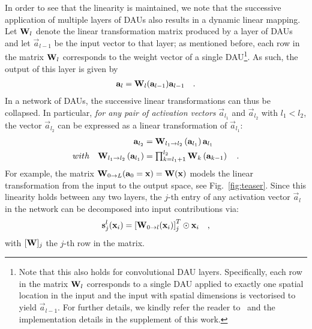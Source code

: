  In order to see that the linearity is maintained, we note that the successive application of multiple layers of DAUs also results in a dynamic linear mapping. Let $\mat W_l$ denote the linear transformation matrix produced by a layer of DAUs and let $\vec a_{l-1}$ be the input vector to that layer; as mentioned before, each row in the matrix $\mat w_l$ corresponds to the weight vector of a single DAU\footnote{
Note that this also holds for convolutional DAU layers. Specifically, each row in the matrix $\mat w_l$ corresponds to a single DAU applied to exactly one spatial location in the input and the input with spatial dimensions is vectorised to yield $\vec a_{l-1}$. For further details, we kindly refer the reader to~\cite{convlin} and the implementation details in the supplement of this work.}. As such, the output of this layer is given by 
\begin{align}
    \vec a_l = \mat W_l (\vec a_{l-1}) \vec a_{l-1}\quad .
\end{align}
In a network of DAUs, the successive linear transformations can thus be collapsed. In particular, \emph{for any pair of activation vectors} $\vec{a}_{l_1}$ and $\vec{a}_{l_2}$ with ${l_1}<{l_2}$, the vector $\vec{a}_{l_2}$ can 
    be expressed as a linear transformation of $\vec{a}_{l_1}$:
\begin{align}
\label{eq:collapse}
    \vec{a}_{l_2} &= \mat{W}_{{l_1}\rightarrow {l_2}} \left(\vec{a}_{l_1}\right)\vec{a}_{l_1} \quad 
        \\{with} \quad \mat{W}_{{l_1}\rightarrow {l_2}}\left(\vec{a}_{l_1}\right) &= \textstyle\prod_{k={l_1}+1}^{l_2} \mat{W}_k \left(\vec{a}_{k-1}\right)\quad \text{.}
\end{align}
For example, the matrix $\mat W_{0\rightarrow L}(\vec{a}_0 = \vec{x}) = \mat W(\vec{x})$ models the linear transformation from the input to the output space, see Fig.~\ref{fig:teaser}.
Since this linearity holds between any two layers, the $j$-th entry of any activation vector $\vec a_l$ in the network can be decomposed into input contributions via:
    \begin{align}
    \label{eq:contrib}
        \vec{s}_{j}^l(\vec x_i) = \left[\mat W_{0\rightarrow l} (\vec{x}_i)\right]_j^T \odot \vec x_i\quad \text{,}
    \end{align}
    with $[\mat W]_j$ the $j$-th row in the matrix.
%

